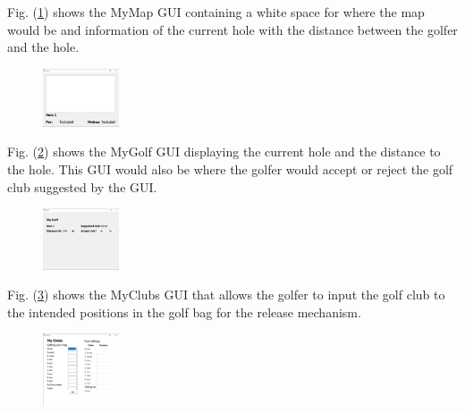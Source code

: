 \documentclass[11pt,landscape]{article}
\begin{document}
\begin{multicols}{3}
Fig. (\ref{fig:MyMap}) shows the MyMap GUI containing a white space for where the map would be and information of the current hole with the distance between the golfer and the hole.

\begin{figure}[H]
    \begin{center}
        \includegraphics[width=0.2\textwidth]{MyMap.png}
    \end{center}
    \label{fig:MyMap}
\end{figure}

Fig. (\ref{fig:MyGolf}) shows the MyGolf GUI displaying the current hole and the distance to the hole. This GUI would also be where the golfer would accept or reject the golf club suggested by the GUI.

\begin{figure}[H]
    \begin{center}
        \includegraphics[width=0.2\textwidth]{MyGolf.png}
    \end{center}
    \label{fig:MyGolf}
\end{figure}

Fig. (\ref{fig:MyClubs}) shows the MyClubs GUI that allows the golfer to input the golf club to the intended positions in the golf bag for the release mechanism.

\begin{figure}[H]
    \begin{center}
        \includegraphics[width=0.2\textwidth]{MyClubs.png}
    \end{center}
    \label{fig:MyClubs}
\end{figure}


\end{multicols}
\end{document}

